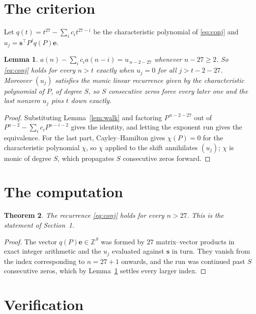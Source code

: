 \documentclass[11pt,a4paper]{article}
\theoremstyle{plain}
\newtheorem{theorem}{Theorem}
\newtheorem{lemma}[theorem]{Lemma}
\theoremstyle{definition}
\begin{document}
\section{The criterion}

Let $q(t)=t^{27}-\sum_i c_i t^{27-i}$ be the characteristic polynomial of
\eqref{eq:conj} and $u_j=\mathbf{s}^{\!\top}P^{j}q(P)\mathbf{e}$.

\begin{lemma}\label{lem:crit}
$a(n)-\sum_i c_i a(n-i)=u_{\,n-2-27}$ whenever $n-27\ge2$. So \eqref{eq:conj}
holds for every $n>t$ exactly when $u_j=0$ for all $j>t-2-27$. Moreover $(u_j)$
satisfies the monic linear recurrence given by the characteristic polynomial of $P$, of
degree $S$, so $S$ consecutive zeros force every later one and the last nonzero $u_j$ pins
$t$ down exactly.
\end{lemma}

\begin{proof}
Substituting Lemma~\ref{lem:walk} and factoring $P^{\,n-2-27}$ out of
$P^{n-2}-\sum_i c_i P^{n-i-2}$ gives the identity, and letting the exponent run gives the
equivalence. For the last part, Cayley--Hamilton gives $\chi(P)=0$ for the characteristic
polynomial $\chi$, so $\chi$ applied to the shift annihilates $(u_j)$; $\chi$ is monic of
degree $S$, which propagates $S$ consecutive zeros forward.
\end{proof}

\section{The computation}

\begin{theorem}
The recurrence \eqref{eq:conj} holds for every $n>27$. This is the statement of
Section~1.
\end{theorem}

\begin{proof}
The vector $q(P)\mathbf{e}\in\mathbb{Z}^{S}$ was formed by $27$ matrix--vector
products in exact integer arithmetic and the $u_j$ evaluated against $\mathbf{s}$ in turn.
They vanish from the index corresponding to $n=27+1$ onwards, and the run was continued
past $S$ consecutive zeros, which by Lemma~\ref{lem:crit} settles every larger index.
\end{proof}

\section{Verification}
\end{document}
